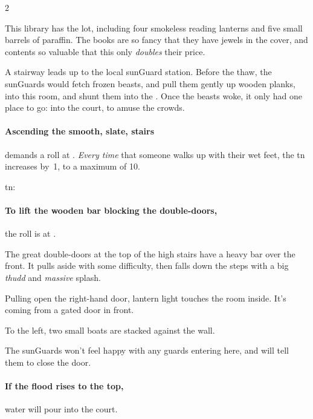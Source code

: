 \begin{multicols}{2}

This library has the lot, including four smokeless reading lanterns and five small barrels of paraffin.
The books are so fancy that they have jewels in the cover, and contents so valuable that this only \emph{doubles} their price.




\begin{exampletext}
  A stairway leads up to the local \gls{sunGuard} station.
  Before the thaw, the \glspl{sunGuard} would fetch frozen beasts, and pull them gently up wooden planks, into this room, and shunt them into the .
  Once the beasts woke, it only had one place to go: into the \gls{court}, to amuse the crowds.
\end{exampletext}

\paragraph{Ascending the smooth, slate, stairs}
demands a  roll at \tn[2].
\emph{Every time} that someone walks up with their wet feet, the \gls{tn} increases by~1, to a maximum of 10.

\setcounter{weight}{2}
\setcounter{freeHP}{8}
\Gls{tn}: \hpStat

\paragraph{To lift the wooden bar blocking the double-doors,}
the roll is  at \tn[7].

\begin{boxtext}
  The great double-doors at the top of the high stairs have a heavy bar over the front.
  It pulls aside with some difficulty, then falls down the steps with a big \emph{thudd} and \emph{massive} splash.

  Pulling open the right-hand door, lantern light touches the room inside.
  It's coming from a gated door in front.

  To the left, two small boats are stacked against the wall.
\end{boxtext}

The \glspl{sunGuard} won't feel happy with any \glspl{guard} entering here, and will tell them to close the door.

\paragraph{If the flood rises to the top,}
water will pour into the \gls{court}.


\end{multicols}
